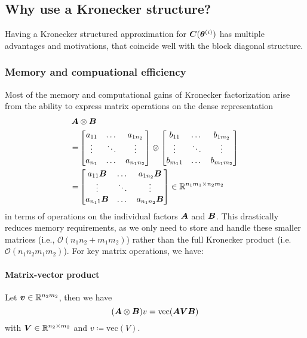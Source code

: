 \subsection{Why use a Kronecker structure?}
Having a Kronecker structured approximation for ${\bm{C}}({\bm{\theta}}^{(i)})$ has multiple advantages and motivations, that coincide well with the block diagonal structure. 

\subsubsection{Memory and compuational efficiency}
Most of the memory and computational gains of Kronecker factorization arise from the ability to express matrix operations on the dense representation
\begin{align*} {\bm{A}} &\otimes {\bm{B}} \\
=&\begin{bmatrix}  
  a_{11} & \dots & a_{1n_2} \\
  \vdots & \ddots & \vdots \\
  a_{n_1} & \dots & a_{n_1n_2}
\end{bmatrix}
\otimes
\begin{bmatrix}
  b_{11} & \dots & b_{1m_2} \\
  \vdots & \ddots & \vdots \\
  b_{m_11} &  \dots & b_{m_1m_2}
\end{bmatrix} \\
=&\begin{bmatrix}  
  a_{11} {\bm{B}} & \dots & a_{1n_2} {\bm{B}} \\
  \vdots & \ddots & \vdots \\
  a_{n_11} {\bm{B}} & \dots & a_{n_1n_2} {\bm{B}}
\end{bmatrix} \in \mathbb{R}^{n_1m_1 \times n_2m_2}
\end{align*}
in terms of operations on the individual factors ${\bm{A}}$ and ${\bm{B}}$. 
This drastically reduces memory requirements, as we only need to store and handle these smaller matrices (i.e., $\mathcal{O}(n_1n_2 + m_1m_2)$) rather than the full Kronecker product (i.e. $\mathcal{O}(n_1n_2m_1m_2)$). For key matrix operations, we have:

\paragraph{Matrix-vector product}
Let ${\bm{v}} \in \mathbb{R}^{n_2m_2}$, then we have
$$ ({\bm{A}} \otimes {\bm{B}}) v = \text{vec}({\bm{A}} {\bm{V}} {\bm{B}}) $$
with ${\bm{V}} \in \mathbb{R}^{n_2\times m_2}$ and $v \coloneqq \text{vec}(V)$. 

